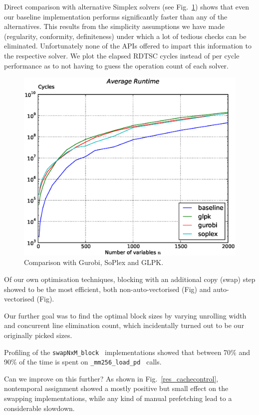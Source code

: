 \documentclass[letterpaper]{article}
\begin{document}
Direct comparison with alternative Simplex solvers (see Fig.~\ref{res_external}) shows that even our baseline implementation performs significantly faster than any of the alternatives.
This results from the simplicity assumptions we have made (regularity, conformity, definiteness) under which a lot of tedious checks can be eliminated.
Unfortunately none of the APIs offered to impart this information to the respective solver.
We plot the elapsed RDTSC cycles instead of per cycle performance as to not having to guess the operation count of each solver.

\begin{figure}\centering
  \includegraphics[scale=0.4]{img/results_compare_external.eps}
  \caption{Comparison with Gurobi, SoPlex and GLPK.\label{res_external}}
\end{figure}


Of our own optimisation techniques, blocking with an additional copy (swap) step showed to be the most efficient, both non-auto-vectorised (Fig) and auto-vectorised (Fig).

Our further goal was to find the optimal block sizes by varying unrolling width and concurrent line elimination count, which incidentally turned out to be our originally picked sizes.



Profiling of the {\tt swapNxM\_block } implementations showed that between 70\% and 90\% of the time is spent on {\tt \_mm256\_load\_pd } calls.


Can we improve on this further?
As shown in Fig.~\ref{res_cachecontrol}, nontemporal assignment showed a mostly positive but small effect on the swapping implementations,
while any kind of manual prefetching lead to a considerable slowdown.
\end{document}
